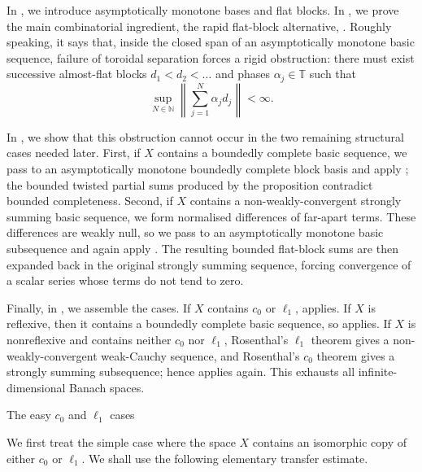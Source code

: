 \documentclass[11pt,reqno]{amsart}
\makeatletter
\theoremstyle{plain}
\theoremstyle{definition}
\newcommand{\N}{\mathbb N}
\newcommand{\T}{\mathbb T}
\newcounter{problempaper}
\newenvironment{problempaperbody}{%
  \setcounter{subsection}{0}%
  \setcounter{subsubsection}{0}%
  \setcounter{paragraph}{0}%
  \renewcommand{\thesubsection}{\arabic{subsection}}%
  \renewcommand{\thesubsubsection}{\thesubsection.\arabic{subsubsection}}%
  \renewcommand{\theparagraph}{\thesubsubsection.\arabic{paragraph}}%
  \let\problem@outersection\section
  \let\problem@outersubsection\subsection
  \let\problem@outersubsubsection\subsubsection
  \let\problem@outerparagraph\paragraph
  \let\section\problem@papersection
  \let\subsection\problem@papersubsection
  \let\subsubsection\problem@papersubsubsection
}{%
  \let\section\problem@outersection
  \let\subsection\problem@outersubsection
  \let\subsubsection\problem@outersubsubsection
  \let\paragraph\problem@outerparagraph
}
\newcommand{\problem@target}[2]{%
  \hypertarget{problem-\theproblempaper-#1-#2}{}%
}
\newcommand{\problem@paperheading}[3]{%
  \par\bigskip
  \problem@target{#1}{#2}%
  \noindent{\large\bfseries #2.\quad #3\par}%
  \nobreak\smallskip
}
\newcommand{\problem@papersubheading}[3]{%
  \par\medskip
  \problem@target{#1}{#2}%
  \noindent{\normalsize\bfseries #2.\quad #3\par}%
  \nobreak\smallskip
}
\newcommand{\problem@papersubsubheading}[3]{%
  \par\smallskip
  \problem@target{#1}{#2}%
  \noindent{\normalsize\itshape #2.\quad #3.\ }%
}
\def\problem@papersection{%
  \@ifstar{\problem@papersectionstar}{\problem@papersectionnostar}%
}
\def\problem@papersectionstar#1{%
  \par\bigskip\noindent{\large\bfseries #1\par}\nobreak\smallskip
}
\def\problem@papersectionnostar#1{%
  \refstepcounter{subsection}%
  \setcounter{subsubsection}{0}%
  \setcounter{paragraph}{0}%
  \problem@paperheading{section}{\thesubsection}{#1}%
  \problem@writecontentsline{section}{\thesubsection}{#1}%
}
\def\problem@papersubsection{%
  \@ifstar{\problem@papersubsectionstar}{\problem@papersubsectionnostar}%
}
\def\problem@papersubsectionstar#1{%
  \par\medskip\noindent{\normalsize\bfseries #1\par}\nobreak\smallskip
}
\def\problem@papersubsectionnostar#1{%
  \refstepcounter{subsubsection}%
  \setcounter{paragraph}{0}%
  \problem@papersubheading{subsection}{\thesubsubsection}{#1}%
  \problem@writecontentsline{subsection}{\thesubsubsection}{#1}%
}
\def\problem@papersubsubsection{%
  \@ifstar{\problem@papersubsubsectionstar}{\problem@papersubsubsectionnostar}%
}
\def\problem@papersubsubsectionstar#1{%
  \par\smallskip\noindent{\normalsize\itshape #1.\ }%
}
\def\problem@papersubsubsectionnostar#1{%
  \refstepcounter{paragraph}%
  \problem@papersubsubheading{subsubsection}{\theparagraph}{#1}%
  \problem@writecontentsline{subsubsection}{\theparagraph}{#1}%
}
\newcommand{\problem@writecontentsline}[3]{%
  \begingroup
  \protected@write\@auxout{}{%
    \string\problemcontentsentry{\theproblempaper}{#1}{#2}{#3}{\thepage}%
  }%
  \endgroup
}
\newcommand{\problemcontentsentry}[5]{%
  \@ifundefined{problemcontents@#1}{%
    \expandafter\gdef\csname problemcontents@#1\endcsname{}%
  }{}%
  \expandafter\g@addto@macro\csname problemcontents@#1\endcsname{%
    \problemcontentsline{#1}{#2}{#3}{#4}{#5}%
  }%
}
\newcommand{\problemcontentslink}[4]{%
  \hyperlink{problem-#1-#2-#3}{#4}%
}
\newcommand{\problemcontentsline}[5]{%
  \ifstrequal{#2}{section}{%
    \par\noindent
    \problemcontentslink{#1}{#2}{#3}{\makebox[2.5em][l]{#3}#4}%
    \nobreak\dotfill
    \problemcontentslink{#1}{#2}{#3}{#5}\par
  }{%
    \ifstrequal{#2}{subsection}{%
      \par\noindent\hspace*{1.5em}%
      \problemcontentslink{#1}{#2}{#3}{\makebox[3.5em][l]{#3}#4}%
      \nobreak\dotfill
      \problemcontentslink{#1}{#2}{#3}{#5}\par
    }{%
      \par\noindent\hspace*{3em}%
      \problemcontentslink{#1}{#2}{#3}{\makebox[4.5em][l]{#3}#4}%
      \nobreak\dotfill
      \problemcontentslink{#1}{#2}{#3}{#5}\par
    }%
  }%
}
\makeatother
\begin{document}
\begin{problempaperbody}
In , we introduce asymptotically monotone bases and flat blocks. In , we prove the main combinatorial ingredient, the rapid flat-block alternative, . Roughly speaking, it says that, inside the closed span of an asymptotically monotone basic sequence, failure of toroidal separation forces a rigid obstruction: there must exist successive almost-flat blocks $d_1<d_2<\ldots$ and phases $\alpha_j\in\T$ such that
\begin{equation*}
        \sup_{N\in\N}\left\|\sum_{j=1}^{N}\alpha_jd_j\right\|<\infty.
\end{equation*}

In , we show that this obstruction cannot occur in the two remaining structural cases needed later. First, if $X$ contains a boundedly complete basic sequence, we pass to an asymptotically monotone boundedly complete block basis and apply ; the bounded twisted partial sums produced by the proposition contradict bounded completeness. Second, if $X$ contains a non-weakly-convergent strongly summing basic sequence, we form normalised differences of far-apart terms. These differences are weakly null, so we pass to an asymptotically monotone basic subsequence and again apply . The resulting bounded flat-block sums are then expanded back in the original strongly summing sequence, forcing convergence of a scalar series whose terms do not tend to zero.

Finally, in , we assemble the cases. If $X$ contains $c_0$ or $\ell_1$,  applies. If $X$ is reflexive, then it contains a boundedly complete basic sequence, so  applies. If $X$ is nonreflexive and contains neither $c_0$ nor $\ell_1$, Rosenthal's $\ell_1$ theorem gives a non-weakly-convergent weak-Cauchy sequence, and Rosenthal's $c_0$ theorem gives a strongly summing subsequence; hence  applies again. This exhausts all infinite-dimensional Banach spaces.


\section{The easy $c_0$ and $\ell_1$ cases}\label{p1-first:sec:easy-c0-l1}

We first treat the simple case where the space $X$ contains an isomorphic copy of either $c_0$ or $\ell_1$. We shall use the following elementary transfer estimate.


\end{problempaperbody}
\end{document}
